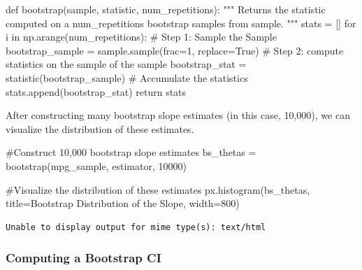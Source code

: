 \documentclass[
  letterpaper,
  DIV=11,
  numbers=noendperiod]{scrreprt}
\newenvironment{Shaded}{\begin{snugshade}}{\end{snugshade}}
\newcommand{\CommentTok}[1]{\textcolor[rgb]{0.37,0.37,0.37}{#1}}
\newcommand{\ControlFlowTok}[1]{\textcolor[rgb]{0.00,0.23,0.31}{#1}}
\newcommand{\DecValTok}[1]{\textcolor[rgb]{0.68,0.00,0.00}{#1}}
\newcommand{\KeywordTok}[1]{\textcolor[rgb]{0.00,0.23,0.31}{#1}}
\newcommand{\NormalTok}[1]{\textcolor[rgb]{0.00,0.23,0.31}{#1}}
\newcommand{\OperatorTok}[1]{\textcolor[rgb]{0.37,0.37,0.37}{#1}}
\newcommand{\StringTok}[1]{\textcolor[rgb]{0.13,0.47,0.30}{#1}}
\newcommand{\VariableTok}[1]{\textcolor[rgb]{0.07,0.07,0.07}{#1}}
\begin{document}
\begin{Shaded}
\begin{Highlighting}[]
\KeywordTok{def}\NormalTok{ bootstrap(sample, statistic, num\_repetitions):}
    \CommentTok{"""}
\CommentTok{    Returns the statistic computed on a num\_repetitions  }
\CommentTok{    bootstrap samples from sample.}
\CommentTok{    """}
\NormalTok{    stats }\OperatorTok{=}\NormalTok{ []}
    \ControlFlowTok{for}\NormalTok{ i }\KeywordTok{in}\NormalTok{ np.arange(num\_repetitions):}
        \CommentTok{\# Step 1: Sample the Sample}
\NormalTok{        bootstrap\_sample }\OperatorTok{=}\NormalTok{ sample.sample(frac}\OperatorTok{=}\DecValTok{1}\NormalTok{, replace}\OperatorTok{=}\VariableTok{True}\NormalTok{)}
        \CommentTok{\# Step 2: compute statistics on the sample of the sample}
\NormalTok{        bootstrap\_stat }\OperatorTok{=}\NormalTok{ statistic(bootstrap\_sample)}
        \CommentTok{\# Accumulate the statistics}
\NormalTok{        stats.append(bootstrap\_stat)}
    \ControlFlowTok{return}\NormalTok{ stats   }
\end{Highlighting}
\end{Shaded}

After constructing many bootstrap slope estimates (in this case,
10,000), we can visualize the distribution of these estimates.

\begin{Shaded}
\begin{Highlighting}[]
\CommentTok{\#Construct 10,000 bootstrap slope estimates}
\NormalTok{bs\_thetas }\OperatorTok{=}\NormalTok{ bootstrap(mpg\_sample, estimator, }\DecValTok{10000}\NormalTok{)}

\CommentTok{\#Visualize the distribution of these estimates}
\NormalTok{px.histogram(bs\_thetas, title}\OperatorTok{=}\StringTok{\textquotesingle{}Bootstrap Distribution of the Slope\textquotesingle{}}\NormalTok{, }
\NormalTok{             width}\OperatorTok{=}\DecValTok{800}\NormalTok{)}
\end{Highlighting}
\end{Shaded}

\begin{verbatim}
Unable to display output for mime type(s): text/html
\end{verbatim}

\subsubsection{Computing a Bootstrap CI}\label{computing-a-bootstrap-ci}
\end{document}
